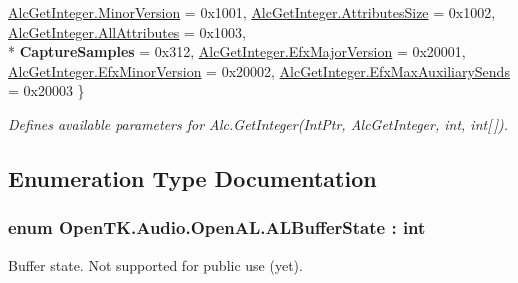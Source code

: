 \begin{DoxyCompactItemize}
\hyperlink{namespace_open_t_k_1_1_audio_1_1_open_a_l_ae26e71360702946aac46d8980c00d350a7ed1393ffe51ed8d4b94258a5eae8ffe}{Alc\-Get\-Integer.\-Minor\-Version} = 0x1001, 
\hyperlink{namespace_open_t_k_1_1_audio_1_1_open_a_l_ae26e71360702946aac46d8980c00d350a0bbb29457687c0c06d45f719e47c17e5}{Alc\-Get\-Integer.\-Attributes\-Size} = 0x1002, 
\hyperlink{namespace_open_t_k_1_1_audio_1_1_open_a_l_ae26e71360702946aac46d8980c00d350a7e49fcf09eba0bf5138522f269346d53}{Alc\-Get\-Integer.\-All\-Attributes} = 0x1003, 
\\*
{\bfseries Capture\-Samples} = 0x312, 
\hyperlink{namespace_open_t_k_1_1_audio_1_1_open_a_l_ae26e71360702946aac46d8980c00d350a80eb100b1afb41869f94af4616ff48d5}{Alc\-Get\-Integer.\-Efx\-Major\-Version} = 0x20001, 
\hyperlink{namespace_open_t_k_1_1_audio_1_1_open_a_l_ae26e71360702946aac46d8980c00d350a95aa24ae90171f0a08032c90f0860f6d}{Alc\-Get\-Integer.\-Efx\-Minor\-Version} = 0x20002, 
\hyperlink{namespace_open_t_k_1_1_audio_1_1_open_a_l_ae26e71360702946aac46d8980c00d350a7ff17bb3868ebe884974e808eab3acf9}{Alc\-Get\-Integer.\-Efx\-Max\-Auxiliary\-Sends} = 0x20003
 \}
\begin{DoxyCompactList}\small\item\em Defines available parameters for Alc.\-Get\-Integer(\-Int\-Ptr, Alc\-Get\-Integer, int, int\mbox{[}$\,$\mbox{]}). \end{DoxyCompactList}\end{DoxyCompactItemize}


\subsection{Enumeration Type Documentation}
\hypertarget{namespace_open_t_k_1_1_audio_1_1_open_a_l_a656c3dc44316f6bb4f8873f841bf39f4}{
\subsubsection[{A\-L\-Buffer\-State}]{\setlength{\rightskip}{0pt plus 5cm}enum {\bf Open\-T\-K.\-Audio.\-Open\-A\-L.\-A\-L\-Buffer\-State} \-: int}}\label{namespace_open_t_k_1_1_audio_1_1_open_a_l_a656c3dc44316f6bb4f8873f841bf39f4}


Buffer state. Not supported for public use (yet).

